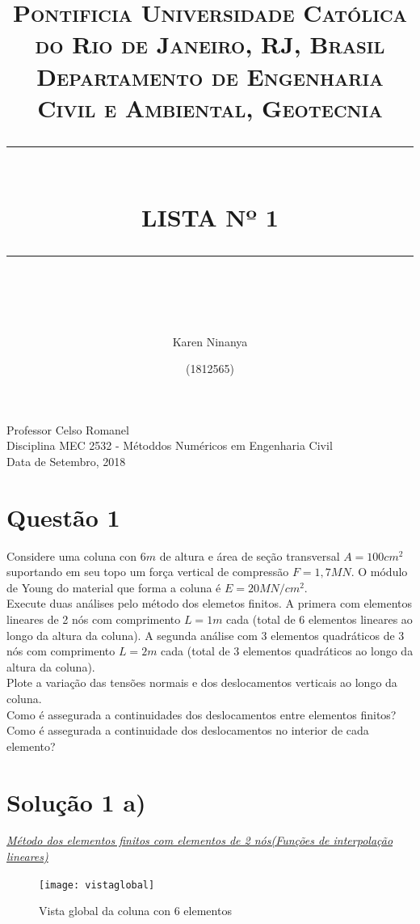 \documentclass{article} %
\title{
	\normalfont \normalsize 
	\textsc{Pontificia Universidade Católica do Rio de Janeiro, RJ, Brasil \\ 
		Departamento de Engenharia Civil e Ambiental, Geotecnia} \\
	[10pt] 
	\rule{\linewidth}{0.5pt} \\[6pt] 
	\huge LISTA Nº 1\\
	\rule{\linewidth}{2pt}  \\[10pt]
}
\author{Karen Ninanya}
\date{\normalsize (1812565)}
\begin{document}
	
	\maketitle
	\noindent
	Professor \dotfill Celso Romanel\\
	Disciplina \dotfill MEC 2532 - Métoddos Numéricos em Engenharia Civil\\
	Data  de Setembro, 2018 \\
	
	\newpage
	\newpage


\section*{Questão 1}

\vspace{10mm}
Considere uma coluna con  \(6m\) de altura e área de seção transversal \(A=100cm^2\) suportando em seu topo um força vertical de compressão \(F=1,7 MN\). O módulo de Young do material  que forma a coluna é \(E=20MN/cm^2\).\\
Execute duas análises pelo método dos elemetos finitos. A primera com elementos lineares de 2 nós com comprimento \(L=1m\) cada (total de 6 elementos lineares ao longo da altura da coluna). A segunda análise com 3 elementos quadráticos de 3 nós com comprimento \(L=2m\) cada (total de 3 elementos quadráticos ao longo da altura da coluna).\\
Plote a variação das tensões normais e dos deslocamentos verticais ao longo da coluna.\\
Como é assegurada a continuidades dos deslocamentos entre elementos finitos?\\
Como é assegurada a continuidade dos deslocamentos no interior de cada elemento?

\newpage
\section*{Solução 1 a)}

\vspace{10mm}

\underline{\large \textit{Método dos elementos finitos com elementos de 2 nós(Funções de interpolação lineares)}}\\


\begin{figure}[H]
	\centering
	\caption{Vista global da coluna con 6 elementos}
	\texttt{[image: vistaglobal]}	
	\label{patton}	
\end{figure}
\end{document}
